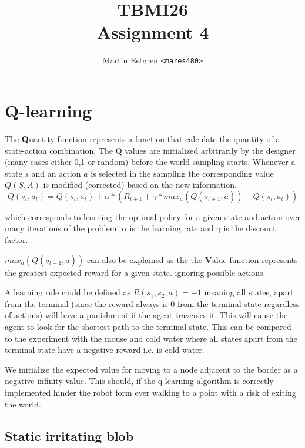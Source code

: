 \documentclass[a4paper,12pt]{article}
\title{TBMI26  \\
       Assignment 4}
\author{Martin Estgren \texttt{<mares480>}}
\begin{document}
    \maketitle %

\section{Q-learning}
  

  The \textbf{Q}uantity-function represents a function that calculate the quantity of a state-action combination. The Q values are initialized arbitrarily by the designer (many cases either 0,1 or random) before the world-sampling starts. Whenever a state $s$ and an action $a$ is selected in the sampling the corresponding value $Q(S,A)$ is modified (corrected) based on the new information.
  \begin{equation}
    Q(s_t,a_t) = Q(s_t,a_t) + \alpha * (R_{t+1} + \gamma * max_a(Q(s_{t+1},a))-Q(s_t,a_t))
  \end{equation}

which corresponds to learning the optimal policy for a given state and action over many iterations of the problem. $\alpha$ is the learning rate and $\gamma$ is the discount factor. 

$ max_a(Q(s_{t+1},a))$ can also be explained as the   the \textbf{V}alue-function represents the greatest expected reward for a given state. ignoring possible actions. 


A learning rule could be defined as $R(s_1,s_2,a) = -1$ meaning all states, apart from the terminal (since the reward always is 0 from the terminal state regardless of actions) will have a punishment if the agent traverses it. This will cause the agent to look for the shortest path to the terminal state. This can be compared to the experiment with the mouse and cold water where all states apart from the terminal state have a negative reward i.e. is cold water.

We initialize the expected value for moving to a node adjacent to the border as a negative infinity value. This should, if the q-learning algorithm is correctly implemented hinder the robot form ever walking to a point with a risk of exiting the world. 

\subsection{Static irritating blob}
\end{document}
